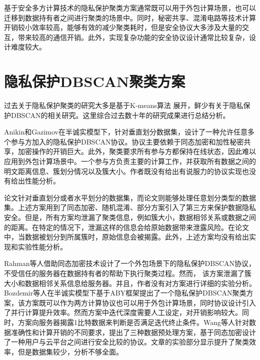 基于安全多方计算技术的隐私保护聚类方案通常既可以用于外包计算场景，也可以迁移到数据持有者之间进行聚类的场景中。同时，秘密共享、混淆电路等技术计算开销较小效率较高，能够有效的减少聚类耗时，但是安全协议大多涉及大量的交互，带来较高的通信开销。此外，实现复杂功能的安全协议设计通常比较复杂，设计难度较大。

\section{隐私保护DBSCAN聚类方案}
过去关于隐私保护聚类的研究大多是基于K-means算法  展开，鲜少有关于隐私保护DBSCAN的相关研究。这里综合过去数十年的研究成果进行总结分析。

Anikin和Gazimov\cite{anikin2017privacy}在半诚实模型下，针对垂直划分数据集，设计了一种允许任意多个参与方加入的隐私保护DBSCAN协议。协议主要依赖于同态加密和加性秘密共享，加密操作的开销巨大。此外，聚类要求所有参与方都保持在线状态，因此难以应用到外包计算场景中。一个参与方负责主要的计算工作，并获取所有数据之间的明文距离信息、簇划分情况以及簇大小。作者既没有给出有说服力的协议实现也没有给出性能分析。

论文\cite{2006Privacy,jiang2008privacy,kumar2007privacy,liu2012privacy,xu2007protocols}针对垂直划分或者水平划分的数据集，而论文\cite{almutairi2018secure,liu2012privacy}则能够处理任意划分类型的数据集。上述方案用到了同态加密、随机混淆、部分方案引入了第三方来保护数据隐私安全。但是，所有方案均泄漏了聚类信息，例如簇大小，数据相邻关系\cite{almutairi2018secure,jiang2008privacy,kumar2007privacy,liu2012privacy,rahman2017towards}或数据之间的距离\cite{2006Privacy}。在特定的情况下，泄漏这样的信息会给原始数据带来泄露风险\cite{kumar2007privacy,liu2012privacy}。在论文\cite{xu2007protocols}中，当数据被划分到所属簇时，原始信息会被揭露。此外，上述方案均没有给出实现和实验性能分析。

Rahman等人\cite{rahman2017towards}借助同态加密技术设计了一个外包场景下的隐私保护DBSCAN协议，不受信任的服务器在数据持有者的帮助下执行聚类过程。然而， 该方案泄漏了簇大小和数据相邻关系信息给服务器。并且，作者没有对方案进行详细的实验分析。Bozdemir等人\cite{2021Privacy}在半诚实模型下基于ABY框架\cite{2015ABY}提出了一个隐私保护DBSCAN聚类方案，该方案既可以作为两方计算协议也可以用于外包计算场景，同时协议设计引入了并行计算提升效率。然而方案中迭代深度需要人工设定，对开销影响较大。同时，方案向服务器揭露1比特数据来判断是否满足迭代终止条件。Wang等人\cite{wang2022homomorphic}针对数据准确性和计算开销的不同要求，提出了三种数据预处理方案，基于同态加密设计了一种用户与云平台之间进行安全比较的协议。文章的实验部分显示提升了聚类效率，但是数据集较少，分析不够全面。


